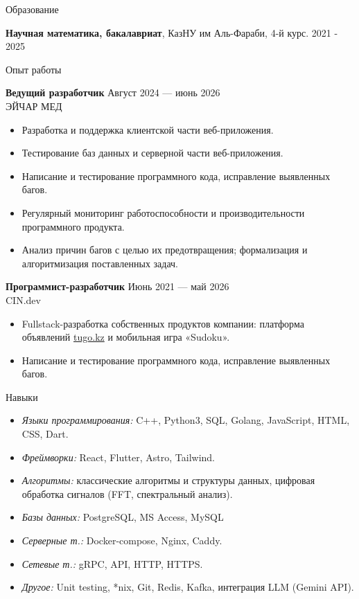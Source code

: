\documentclass{resume} %
\begin{document}
\begin{rSection}{Образование}

{\bf Научная математика, бакалавриат}, КазНУ им Аль-Фараби, 4-й курс. \hfill {2021 - 2025}
\end{rSection}

\begin{rSection}{Опыт работы}

\textbf{Ведущий разработчик} \hfill {Август 2024 — июнь 2026}\\
ЭЙЧАР МЕД
\begin{itemize}
    \item Разработка и поддержка клиентской части веб-приложения.
    \item Тестирование баз данных и серверной части веб-приложения.
    \item Написание и тестирование программного кода, исправление выявленных багов.
    \item Регулярный мониторинг работоспособности и производительности программного продукта.
    \item Анализ причин багов с целью их предотвращения; формализация и алгоритмизация поставленных задач.
\end{itemize}

\textbf{Программист-разработчик} \hfill {Июнь 2021 — май 2026}\\
CIN.dev
\begin{itemize}
    \item Fullstack-разработка собственных продуктов компании: платформа объявлений \href{https://tugo.kz}{tugo.kz} и мобильная игра «Sudoku».
    \item Написание и тестирование программного кода, исправление выявленных багов.
\end{itemize}

\end{rSection}

\begin{rSection}{Навыки}
\begin{itemize}
    \item \textit{Языки программирования:} C++, Python3, SQL, Golang, JavaScript, HTML, CSS, Dart.
    \item \textit{Фреймворки:} React, Flutter, Astro, Tailwind.
    \item \textit{Алгоритмы:} классические алгоритмы и структуры данных, цифровая обработка сигналов (FFT, спектральный анализ).
    \item \textit{Базы данных:} PostgreSQL, MS Access, MySQL
    \item \textit{Серверные т.:} Docker-compose, Nginx, Caddy.
    \item \textit{Сетевые т.:} gRPC, API, HTTP, HTTPS.
    \item \textit{Другое:} Unit testing, *nix, Git, Redis, Kafka, интеграция LLM (Gemini API).
\end{itemize}
\end{rSection}
\end{document}

